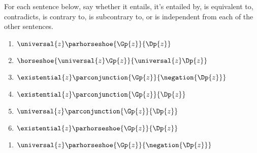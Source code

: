  For each sentence below, say whether it entails, it's entailed by, is equivalent to, contradicts, is contrary to, is subcontrary to, or is independent from each of the other sentences. 
\begin{multicols}{2}
\begin{enumerate}
\item {$\universal{\variable{z}}\parhorseshoe{\Gp{\variable{z}}}{\Dp{\variable{z}}}$}
\item {$\horseshoe{\universal{\variable{z}}\Gp{\variable{z}}}{\universal{\variable{z}}\Dp{\variable{z}}}$}
\item {$\existential{\variable{z}}\parconjunction{\Gp{\variable{z}}}{\negation{\Dp{\variable{z}}}}$}
\item {$\existential{\variable{z}}\parconjunction{\Gp{\variable{z}}}{\Dp{\variable{z}}}$}
\item {$\universal{\variable{z}}\parconjunction{\Gp{\variable{z}}}{\Dp{\variable{z}}}$}
\item {$\existential{\variable{z}}\parhorseshoe{\Gp{\variable{z}}}{\Dp{\variable{z}}}$}
\end{enumerate}
\end{multicols}
\begin{enumerate}[start=7] 
\item {$\universal{\variable{z}}\parhorseshoe{\Gp{\variable{z}}}{\negation{\Dp{\variable{z}}}}$}
\end{enumerate}




